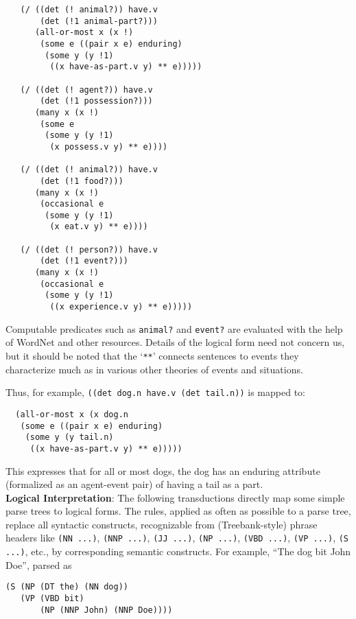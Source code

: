 \documentclass[a4,11pt]{article}
\begin{document}
\footnotesize
\begin{verbatim}
   (/ ((det (! animal?)) have.v 
       (det (!1 animal-part?)))
      (all-or-most x (x !)
       (some e ((pair x e) enduring)
        (some y (y !1)
         ((x have-as-part.v y) ** e)))))

   (/ ((det (! agent?)) have.v 
       (det (!1 possession?)))
      (many x (x !)
       (some e
        (some y (y !1)
         (x possess.v y) ** e))))

   (/ ((det (! animal?)) have.v 
       (det (!1 food?)))
      (many x (x !)
       (occasional e
        (some y (y !1)
         (x eat.v y) ** e))))

   (/ ((det (! person?)) have.v 
       (det (!1 event?)))
      (many x (x !)
       (occasional e
        (some y (y !1)
         ((x experience.v y) ** e)))))
\end{verbatim}

\normalsize
Computable predicates such as \texttt{animal?} and \texttt{event?} are evaluated with the help of WordNet and other resources. Details of the logical form need not concern us, but it should be noted that the `\texttt{**}' connects sentences to events they characterize much as in various other theories of events and situations.

Thus, for example, \texttt{((det dog.n have.v (det tail.n))} is mapped to:

\footnotesize
\begin{verbatim}
  (all-or-most x (x dog.n
   (some e ((pair x e) enduring)
    (some y (y tail.n)
     ((x have-as-part.v y) ** e)))))
\end{verbatim}

\normalsize
\noindent This expresses that for all or most dogs, the dog has an enduring
attribute (formalized as an agent-event pair) of having a tail as a part.\\

{\bf Logical Interpretation}:
The following transductions directly map some simple parse trees to logical forms. The rules, applied as often as possible to a parse tree, replace all syntactic constructs, recognizable from (Treebank-style) phrase headers like {\small\tt (NN ...)}, {\small\tt (NNP ...)}, {\small\tt (JJ ...)}, {\small\tt (NP ...)}, {\small\tt (VBD ...)}, {\small\tt (VP ...)}, {\small\tt (S ...)}, etc., by corresponding semantic constructs.  For example, ``The dog bit John Doe'', parsed as 

\small
\begin{verbatim}
(S (NP (DT the) (NN dog)) 
   (VP (VBD bit) 
       (NP (NNP John) (NNP Doe))))
\end{verbatim}
\end{document}
